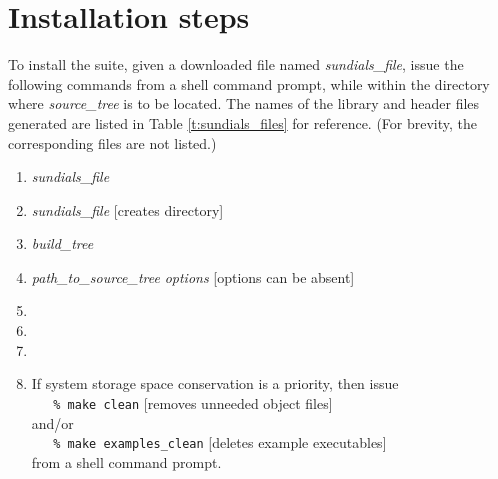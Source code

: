 \section{Installation steps}\label{ss:install_steps}

To install the {\sundials} suite, given a downloaded file named
{\em sundials\_file}, issue the following commands from
a shell command prompt, while within the directory where {\em source\_tree}
is to be located.  The names of the library and header files
generated are listed in Table \ref{t:sundials_files} for reference.
(For brevity, the corresponding  files are not listed.)
\begin{enumerate}
\item {} {\em sundials\_file}
\item {} {\em sundials\_file}\hspace{3em} [creates  directory]
\item {} {\em build\_tree}
\item {\em path\_to\_source\_tree} {\em options}\hspace{2em} [options can be absent]
\item {}
\item {}
\item {}
\item If system storage space conservation is a priority, then issue \\
\verb+   % make clean+ \hspace{2em} [removes unneeded object files] \\
and/or \\
\verb+   % make examples_clean+ \hspace{2em} [deletes example executables] \\
from a shell command prompt.
\end{enumerate}

